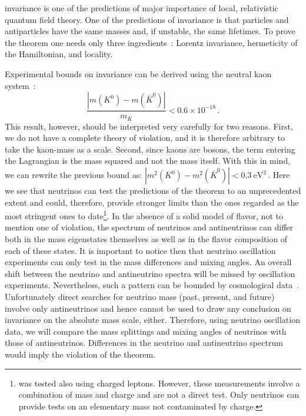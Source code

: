 %
 invariance is one of the predictions of major importance of local, relativistic quantum field theory. One of the predictions of  invariance is that particles and antiparticles have the same masses and, if unstable, the same lifetimes. To prove the  theorem one needs only three ingredients~\cite{Streater:1989vi}: Lorentz invariance, hermeticity of the Hamiltonian, and locality.
%

Experimental bounds on  invariance can be derived using the neutral kaon system~\cite{Schwingenheuer:1995uf}:
%
\begin{equation}
  \frac{|m(K^0) - m(\overline{K}^0)|}{m_K} < 0.6 \times 10^{-18}\,. 
  \label{eq:mK}
\end{equation}
%
This result, however, should be interpreted very carefully for two reasons. First, we do not have a complete theory of  violation, and it is therefore arbitrary to take the kaon-mass as a scale. Second, since kaons are bosons, the term entering the Lagrangian is the mass squared and not the mass itself. With this in mind, we can rewrite the previous bound as:
%
 $ |m^2(K^0) - m^2(\overline{K}^0)| < 0.3~\mbox{eV}^2 \, $.
%
Here we %
see that neutrinos can test the predictions of the  theorem to an unprecedented extent and could, therefore, provide stronger limits than the ones regarded as the most stringent ones %
to date\footnote{ was tested also using charged leptons. However, these measurements involve a combination
of mass and charge and are not a direct  test. Only neutrinos can provide  tests on an elementary mass not contaminated by charge.}. 
%
In the absence of a solid model of flavor, not to mention one of  violation, the spectrum  of neutrinos and antineutrinos can differ both  in the mass eigenstates themselves as well as in the flavor composition of each of these states. It is important to notice then that neutrino oscillation experiments can only test  in the mass differences and mixing angles. An overall shift between the neutrino and antineutrino spectra will be missed by oscillation experiments.  Nevertheless, such a pattern can be bounded by cosmological data~\cite{Barenboim:2017vlc}. Unfortunately direct searches for neutrino mass (past, present, and future) involve only antineutrinos and hence cannot be used to draw any conclusion on  invariance on the absolute mass scale, either.
%
Therefore, using neutrino oscillation data, we will compare the mass splittings and mixing angles of  neutrinos with those of antineutrinos. Differences in the neutrino and antineutrino spectrum would imply the violation of the  theorem.

